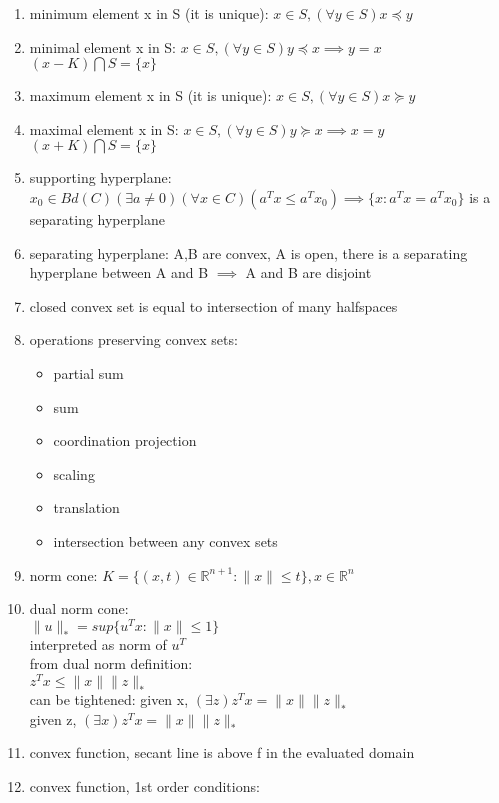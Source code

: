\documentclass[12pt,letter]{article}
\newcommand{\R}{\mathbb{R}}
\newcommand{\norm}[1]{\|#1\|}
\newcommand{\set}[1]{\{#1\}}
\begin{document}
\begin{enumerate}
\item minimum element x in S (it is unique): $x\in S, (\forall y \in S)x \preceq y$
\item minimal element x in S: $x\in S, (\forall y \in S)y \preceq x \implies y=x$\\
  $(x-K)\bigcap S = \{x\}$
\item maximum element x in S (it is unique): $x\in S, (\forall y \in S)x \succeq y$
\item maximal element x in S: $x\in S, (\forall y \in S)y \succeq x \implies x=y$\\
  $(x+K)\bigcap S = \{x\}$
\item supporting hyperplane: $x_0 \in Bd(C) (\exists a \neq 0)(\forall x \in C)(a^Tx \leq a^Tx_0) \implies \{ x: a^Tx = a^T x_0\}$ is a separating hyperplane
\item separating hyperplane: A,B are convex, A is open, there is a separating hyperplane between A and B $\implies$ A and B are disjoint
\item closed convex set is equal to intersection of many halfspaces
\item operations preserving convex sets:
  \begin{itemize}
  \item partial sum
  \item sum
  \item coordination projection
  \item scaling
  \item translation
  \item intersection between any convex sets
  \end{itemize}
\item norm cone: $K=\set{(x,t) \in \R^{n+1} : \norm{x} \leq t}, x \in \R^n$
\item dual norm cone:\\
  $\norm{u}_* = sup \set{ u^Tx: \norm{x} \leq 1}$\\
  interpreted as norm of $u^T$\\
  from dual norm definition:\\
  $z^T x \leq \norm{x} \norm{z}_*$\\
  can be tightened: given x, $(\exists z) z^T x = \norm{x} \norm{z}_*$\\
  given z, $(\exists x) z^T x = \norm{x} \norm{z}_*$\\
\item convex function, secant line is above f in the evaluated domain
\item convex function, 1st order conditions:\\

\end{enumerate}
\end{document}
